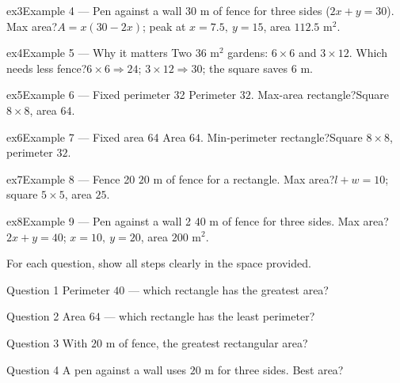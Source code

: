 \documentclass[11pt]{article}
\begin{document}
\begin{example}{ex3}{Example 4 --- Pen against a wall}
$30$ m of fence for three sides ($2x+y=30$). Max area?\soln $A=x(30-2x)$; peak at $x=7.5,\ y=15$, area $112.5$ m$^2$.
\end{example}

\begin{example}{ex4}{Example 5 --- Why it matters}
Two $36$ m$^2$ gardens: $6\times6$ and $3\times12$. Which needs less fence?\soln $6\times6\Rightarrow24$; $3\times12\Rightarrow30$; the square saves $6$ m.
\end{example}

\begin{example}{ex5}{Example 6 --- Fixed perimeter 32}
Perimeter $32$. Max-area rectangle?\soln Square $8\times8$, area $64$.
\end{example}

\begin{example}{ex6}{Example 7 --- Fixed area 64}
Area $64$. Min-perimeter rectangle?\soln Square $8\times8$, perimeter $32$.
\end{example}

\begin{example}{ex7}{Example 8 --- Fence 20}
$20$ m of fence for a rectangle. Max area?\soln $l+w=10$; square $5\times5$, area $25$.
\end{example}

\begin{example}{ex8}{Example 9 --- Pen against a wall 2}
$40$ m of fence for three sides. Max area?\soln $2x+y=40$; $x=10,\ y=20$, area $200$ m$^2$.
\end{example}

\clearpage
{}
For each question, show all steps clearly in the space provided.

\begin{qbox}{Question 1}
Perimeter $40$ — which rectangle has the greatest area?\workspace{2.4cm}
\end{qbox}

\begin{qbox}{Question 2}
Area $64$ — which rectangle has the least perimeter?\workspace{2.4cm}
\end{qbox}

\begin{qbox}{Question 3}
With $20$ m of fence, the greatest rectangular area?\workspace{2.4cm}
\end{qbox}

\begin{qbox}{Question 4}
A pen against a wall uses $20$ m for three sides. Best area?\workspace{2.4cm}
\end{qbox}
\end{document}

